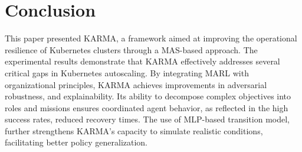 \documentclass[conference]{IEEEtran}
\begin{document}

\section{Conclusion}
\label{sec:conclusion}

This paper presented KARMA, a framework aimed at improving the operational resilience of Kubernetes clusters through a MAS-based approach.
The experimental results demonstrate that KARMA effectively addresses several critical gaps in Kubernetes autoscaling. By integrating MARL with organizational principles, KARMA achieves improvements in adversarial robustness, and explainability. Its ability to decompose complex objectives into roles and missions ensures coordinated agent behavior, as reflected in the high success rates, reduced recovery times. The use of MLP-based transition model, further strengthens KARMA's capacity to simulate realistic conditions, facilitating better policy generalization.
%
%
\end{document}
